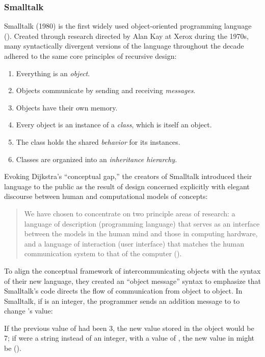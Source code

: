 \subsubsection{Smalltalk}
Smalltalk (1980) is the first widely used object-oriented programming language (\cite{Sammet:1991pd}). Created through research directed by Alan Kay at Xerox during the 1970s, many syntactically divergent versions of the language throughout the decade adhered to the same core principles of recursive design:

\begin{enumerate}
\item Everything is an \emph{object}.
\item Objects communicate by sending and receiving \emph{messages}.
\item Objects have their own memory.
\item Every object is an instance of a \emph{class}, which is itself an object.
\item The class holds the shared \emph{behavior} for its instances.
\item Classes are organized into an \emph{inheritance hierarchy}.
\end{enumerate}

\noindent Evoking Dijkstra's ``conceptual gap,'' the creators of Smalltalk introduced their language to the public as the result of design concerned explicitly with elegant discourse between human and computational models of concepts: 

\begin{quote}We have chosen to concentrate on two principle areas of research: a language of description (programming language) that serves as an interface between the models in the human mind and those in computing hardware, and a language of interaction (user interface) that matches the human communication system to that of the computer (\cite{Ingalls:1981kx}).
\end{quote}

\noindent To align the conceptual framework of intercommunicating objects with the syntax of their new language, they created an ``object message'' syntax to emphasize that Smalltalk's code directs the flow of communication from object to object. In Smalltalk, if  is an integer, the programmer sends an addition message to  to change 's value: 


\noindent If the previous value of  had been 3, the new value stored in the object would be 7; if  were a string instead of an integer, with a value of , the new value in  might be  (\cite{Ingalls:1978fk}).

